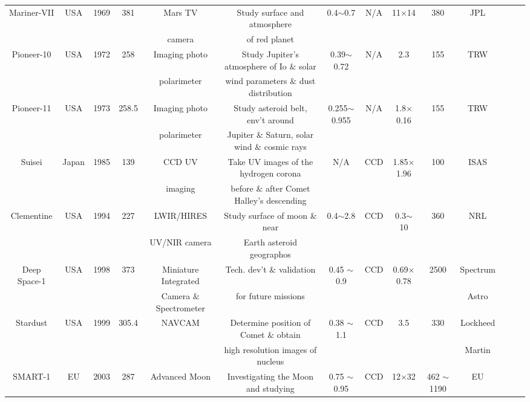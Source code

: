 \documentclass[final,5p,times,sort&compress,twocolumn]{elsarticle}
\begin{document}
\begin{table}
{\begin{tabular}{c c c c c c c c c c c c c c}
			Mariner-VII & USA & 1969 & 381 & Mars TV & Study surface and atmosphere  & 0.4$\sim$0.7 & N/A & 11$\times$14 & 380 & JPL & \cite{siddiqi2018beyond, Henin2021ImagingOS}\\
			& & & & camera & of red planet & & & & & & & \\
			Pioneer-10 & USA & 1972& 258 & Imaging photo & Study Jupiter's atmosphere of Io $\&$ solar  & 0.39$\sim$0.72 & N/A & 2.3 & 155 & TRW & \cite{siddiqi2018beyond, gehrels1974imaging}\\
			& & & & polarimeter & wind parameters $\&$ dust distribution & & & & & & &\\
			Pioneer-11 & USA & 1973 & 258.5 & Imaging photo & Study asteroid belt, env't around  & 0.255$\sim$0.955 & N/A & 1.8$\times$0.16 & 155 & TRW & \cite{siddiqi2018beyond, fimmel1977pioneer}\\
			& & & & polarimeter & Jupiter $\&$ Saturn, solar wind $\&$ cosmic rays & & & & & & & &\\
			Suisei & Japan & 1985 & 139 & CCD UV  & Take UV images of the hydrogen corona & N/A & CCD & 1.85$\times$1.96 & 100 &  ISAS & \cite{siddiqi2018beyond, Henin2021ImagingOS}\\
			& & & & imaging & before $\&$ after Comet Halley's descending & & & & & & &\\
			Clementine & USA & 1994 & 227 & LWIR/HIRES & Study surface of moon $\&$ near  & 0.4$\sim$2.8 & CCD & 0.3$\sim$10 & 360 &  NRL & \cite{siddiqi2018beyond, nozette1994clementine}\\
			& & & & UV/NIR camera & Earth asteroid geographos & & & & & & &\\
			Deep Space-1 & USA & 1998 & 373 & Miniature Integrated & Tech. dev't $\&$ validation  & 0.45 $\sim$ 0.9 & CCD & 0.69$\times$0.78 &2500 &  Spectrum & \cite{rodgers2007advanced, siddiqi2018beyond}\\
			& & & & Camera $\&$ Spectrometer &  for future missions & & & &  &  Astro&\\
			Stardust & USA & 1999 & 305.4 & NAVCAM & Determine position of Comet $\&$ obtain & 0.38 $\sim$ 1.1 & CCD & 3.5 & 330 & Lockheed & \cite{siddiqi2018beyond, sandford2006organics}\\
			& & & & & high resolution images of nucleus & & & & &  Martin &\\
			SMART-1 & EU & 2003 & 287 & Advanced Moon & Investigating the Moon and studying  & 0.75 $\sim$ 0.95 & CCD & 12$\times$32 & 462 $\sim$ 1190 & EU & \cite{racca2002smart, Henin2021ImagingOS}\\

\end{tabular}}
\end{table}
\end{document}

